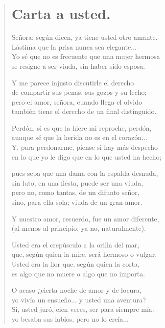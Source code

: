 \documentclass[11pt, portrait, twoside, notitlepage, openright]{book}
\begin{document}
\newpage
\begin{verse}
\begin{center}
\section{Carta a usted.}
\end{center}
Señora; según dicen, ya tiene usted otro amante.\\
Lástima que la prisa nunca sea elegante...\\
Yo sé que no es frecuente que una mujer hermosa\\
se resigne a ser viuda, sin haber sido esposa.
\newline

Y me parece injusto discutirle el derecho\\
de compartir sus penas, sus gozos y su lecho;\\
pero el amor, señora, cuando llega el olvido\\
también tiene el derecho de un final distinguido.
\newline

Perdón, si es que la hiere mi reproche, perdón,\\
aunque sé que la herida no es en el corazón...\\
Y, para perdonarme, piense si hay más despecho\\
en lo que yo le digo que en lo que usted ha hecho;
\newline

pues sepa que una dama con la espalda desnuda,\\
sin luto, en una fiesta, puede ser una viuda,\\
pero no, como tantas, de un difunto señor,\\
sino, para ella sola; viuda de un gran amor.
\newpage

Y nuestro amor, recuerdo, fue un amor diferente,\\
(al menos al principio, ya no, naturalmente).

Usted era el crepúsculo a la orilla del mar,\\
que, según quien la mire, será hermoso o vulgar.\\
Usted era la flor que, según quien la corta,\\
es algo que no muere o algo que no importa.
\newline

O acaso ¿cierta noche de amor y de locura,\\
yo vivía un ensueño... y usted una aventura?\\
Si, usted juró, cien veces, ser para siempre mía:\\
yo besaba sus labios, pero no lo creía...
\newline


\end{verse}
\end{document}
